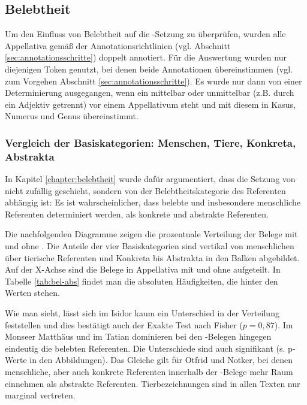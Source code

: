 \subsection{Belebtheit}\label{sec:ergeb-belebtheit}

Um den Einfluss von Belebtheit auf die -Setzung zu überprüfen, wurden alle Appellativa gemäß der Annotationsrichtlinien (vgl. Abschnitt  \ref{sec:annotationsschritte}) doppelt annotiert. Für die Auswertung wurden nur diejenigen Token genutzt, bei denen beide Annotationen übereinstimmen (vgl. zum Vorgehen Abschnitt \ref{sec:annotationsschritte}). Es wurde nur dann von einer Determinierung ausgegangen, wenn ein  mittelbar oder unmittelbar (z.B. durch ein Adjektiv getrennt) vor einem Appellativum steht und mit diesem in Kasus, Numerus und Genus  übereinstimmt.    

\subsubsection{Vergleich der Basiskategorien: Menschen, Tiere, Konkreta, Abstrakta}

In Kapitel \ref{chapter:belebtheit} wurde dafür argumentiert, dass die Setzung von  nicht zufällig geschieht, sondern von der Belebtheitskategorie des Referenten abhängig ist: Es ist wahrscheinlicher, dass belebte und insbesondere menschliche Referenten determiniert werden, als konkrete und abstrakte Referenten.

Die nachfolgenden Diagramme zeigen  die prozentuale Verteilung der Belege mit und ohne  . Die Anteile der vier Basiskategorien sind vertikal von menschlichen über tierische Referenten und Konkreta bis Abstrakta in den Balken abgebildet. Auf der X-Achse sind die Belege in Appellativa mit   und ohne   aufgeteilt.  In Tabelle \ref{tab:bel-abs} findet man die absoluten Häufigkeiten, die hinter den Werten stehen.

Wie man sieht, lässt sich im Isidor kaum ein Unterschied in der Verteilung feststellen und dies bestätigt auch der Exakte Test nach Fisher ($p = 0,87$). Im Monseer Matthäus und im Tatian dominieren bei den -Belegen hingegen eindeutig die belebten Referenten. Die Unterschiede sind auch signifikant (s. p-Werte in den Abbildungen). Das Gleiche gilt für Otfrid und Notker, bei denen menschliche, aber auch konkrete Referenten innerhalb der -Belege mehr Raum einnehmen als abstrakte Referenten. Tierbezeichnungen sind in allen Texten nur marginal vertreten.

